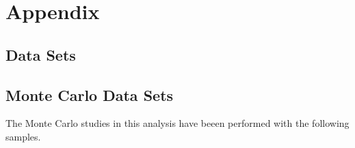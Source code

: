 
\chapter{Appendix}
\label{ch:app:physics}

\section{Data Sets}

\section{Monte Carlo Data Sets}

The Monte Carlo studies in this analysis have beeen performed with the following samples.

